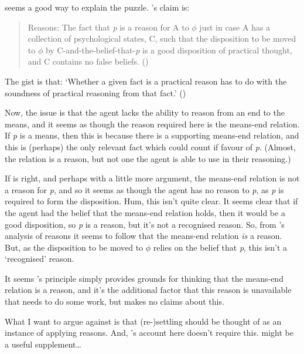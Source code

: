 \documentclass[10pt]{article}
\begin{document}
\begin{wodge}
  \textcite{Setiya:2014aa} seems a good way to explain the puzzle.
  \citeauthor{Setiya:2014aa}'s claim is:
  \begin{quote}
    Reasons: The fact that \emph{p} is a reason for A to \(\phi\) just in case A has a collection of psychological states, C, such that the disposition to be moved to \(\phi\) by C-and-the-belief-that-\emph{p} is a good disposition of practical thought, and C contains no false beliefs.\nolinebreak
    \mbox{}\hfill\mbox{(\citeyear[12]{Setiya:2007aa})}
  \end{quote}
  The gist is that: `Whether a given fact is a practical reason has to do with the soundness of practical reasoning from that fact.' (\citeyear[223]{Setiya:2014aa})

  Now, the issue is that the agent lacks the ability to reason from an end to the means, and it seems as though the reason required here is the means-end relation.
  If \emph{p} is a means, then this is because there is a supporting means-end relation, and this is (perhaps) the only relevant fact which could count if favour of \emph{p}.
  (Almost, the relation is a reason, but not one the agent is able to use in their reasoning.)

  If \citeauthor{Setiya:2007aa} is right, and perhaps with a little more argument, the means-end relation is not a reason for \emph{p}, and so it seems as though the agent has no reason to \emph{p}, as \emph{p} is required to form the disposition.
  Hum, this isn't quite clear.
  It seems clear that if the agent had the belief that the means-end relation holds, then it would be a good disposition, so \emph{p} is a reason, but it's not a recognised reason.
  So, from \citeauthor{Setiya:2007aa}'s analysis of reasons it seems to follow that the means-end relation \emph{is} a reason.
  But, as the disposition to be moved to \(\phi\) relies on the belief that \emph{p}, this isn't a `recognised' reason.

  It seems \citeauthor{Setiya:2007aa}'s principle simply provides grounds for thinking that the means-end relation is a reason, and it's the additional factor that this reason is unavailable that needs to do some work, but \citeauthor{Setiya:2007aa} makes no claims about this.

  What I want to argue against is that (re-)settling should be thought of as an instance of applying reasons.
  And, \citeauthor{Setiya:2007aa}'s account here doesn't require this.
  \citeauthor{Hieronymi:2011aa} might be a useful supplement\dots
\end{wodge}
\end{document}
